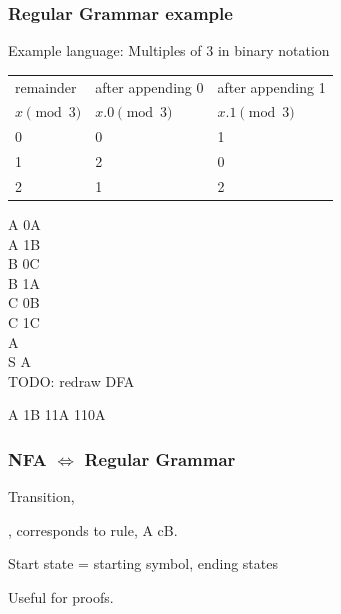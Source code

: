 \documentclass[languages_and_machines.tex]{subfiles}
\begin{document}
\begin{frame}
  \frametitle{Regular Grammar example}

  Example language: Multiples of 3 in binary notation

{\footnotesize
  \begin{tabular}{l||p{4cm}|p{4cm}}
    remainder & after appending 0 & after appending 1 \\
    \(x \pmod 3\) & \(x.0 \pmod 3\) & \(x.1 \pmod 3\)
    \\ \hline \hline 0 & 0 & 1
    \\ \hline 1 & 2 & 0
    \\ \hline 2 & 1 & 2
    \\
  \end{tabular}
  }

A \pro 0A \\
A \pro 1B \\
B \pro 0C \\
B \pro 1A \\
C \pro 0B \\
C \pro 1C \\
\pause
A \pro \emptystr \\
S \pro A \\

TODO: redraw DFA

A \pro 1B \pro 11A \pro 110A 
\end{frame}

\begin{frame}
  \frametitle{NFA \(\iff\) Regular Grammar}

  Transition,
  ,
  corresponds to rule,
  A \pro cB.

  Start state = starting symbol, ending states \pro \emptystr

  Useful for proofs.

\end{frame}
\end{document}
